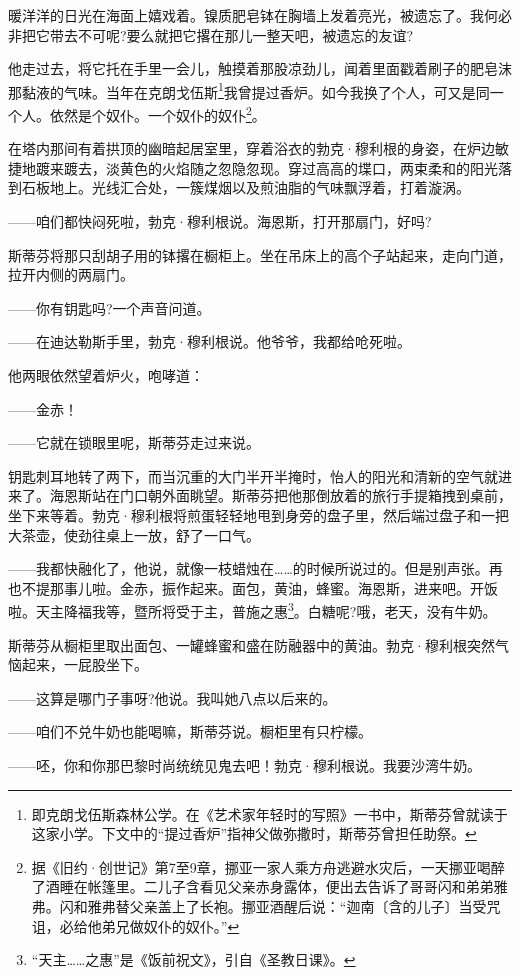 \par 暖洋洋的日光在海面上嬉戏着。镍质肥皂钵在胸墙上发着亮光，被遗忘了。我何必非把它带去不可呢?要么就把它撂在那儿一整天吧，被遗忘的友谊?
\par 他走过去，将它托在手里一会儿，触摸着那股凉劲儿，闻着里面戳着刷子的肥皂沫那黏液的气味。当年在克朗戈伍斯\footnote{即克朗戈伍斯森林公学。在《艺术家年轻时的写照》一书中，斯蒂芬曾就读于这家小学。下文中的“提过香炉”指神父做弥撒时，斯蒂芬曾担任助祭。}我曾提过香炉。如今我换了个人，可又是同一个人。依然是个奴仆。一个奴仆的奴仆\footnote{据《旧约·创世记》第7至9章，挪亚一家人乘方舟逃避水灾后，一天挪亚喝醉了酒睡在帐篷里。二儿子含看见父亲赤身露体，便出去告诉了哥哥闪和弟弟雅弗。闪和雅弗替父亲盖上了长袍。挪亚酒醒后说：“迦南〔含的儿子〕当受咒诅，必给他弟兄做奴仆的奴仆。”}。
\par 在塔内那间有着拱顶的幽暗起居室里，穿着浴衣的勃克·穆利根的身姿，在炉边敏捷地踱来踱去，淡黄色的火焰随之忽隐忽现。穿过高高的堞口，两束柔和的阳光落到石板地上。光线汇合处，一簇煤烟以及煎油脂的气味飘浮着，打着漩涡。
\par ——咱们都快闷死啦，勃克·穆利根说。海恩斯，打开那扇门，好吗?
\par 斯蒂芬将那只刮胡子用的钵撂在橱柜上。坐在吊床上的高个子站起来，走向门道，拉开内侧的两扇门。
\par ——你有钥匙吗?一个声音问道。
\par ——在迪达勒斯手里，勃克·穆利根说。他爷爷，我都给呛死啦。
\par 他两眼依然望着炉火，咆哮道：
\par ——金赤！
\par ——它就在锁眼里呢，斯蒂芬走过来说。
\par 钥匙刺耳地转了两下，而当沉重的大门半开半掩时，怡人的阳光和清新的空气就进来了。海恩斯站在门口朝外面眺望。斯蒂芬把他那倒放着的旅行手提箱拽到桌前，坐下来等着。勃克·穆利根将煎蛋轻轻地甩到身旁的盘子里，然后端过盘子和一把大茶壶，使劲往桌上一放，舒了一口气。
\par ——我都快融化了，他说，就像一枝蜡烛在……的时候所说过的。但是别声张。再也不提那事儿啦。金赤，振作起来。面包，黄油，蜂蜜。海恩斯，进来吧。开饭啦。天主降福我等，暨所将受于主，普施之惠\footnote{“天主……之惠”是《饭前祝文》，引自《圣教日课》。}。白糖呢?哦，老天，没有牛奶。
\par 斯蒂芬从橱柜里取出面包、一罐蜂蜜和盛在防融器中的黄油。勃克·穆利根突然气恼起来，一屁股坐下。
\par ——这算是哪门子事呀?他说。我叫她八点以后来的。
\par ——咱们不兑牛奶也能喝嘛，斯蒂芬说。橱柜里有只柠檬。
\par ——呸，你和你那巴黎时尚统统见鬼去吧！勃克·穆利根说。我要沙湾牛奶。
